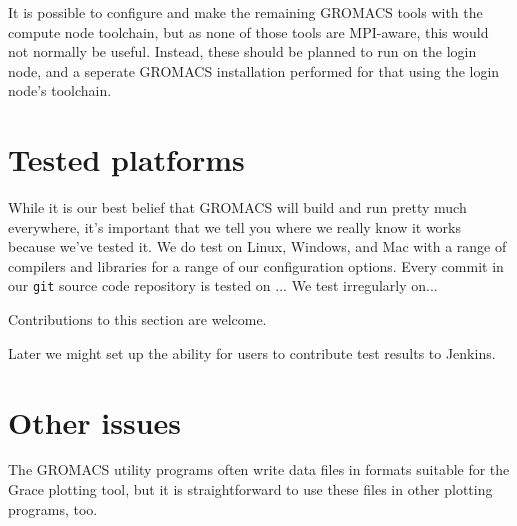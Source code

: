 \documentclass{article}[12pt,a4paper,twoside]
\newcommand{\gromacs}{GROMACS}
\newcommand{\mpi}{MPI}
\newcommand{\grace}{Grace}
\begin{document}
It is possible to configure and make the remaining \gromacs{} tools
with the compute node toolchain, but as none of those tools are
\mpi{}-aware, this would not normally be useful. Instead, these should
be planned to run on the login node, and a seperate \gromacs{}
installation performed for that using the login node's toolchain.

\section{Tested platforms}

While it is our best belief that \gromacs{} will build and run pretty
much everywhere, it's important that we tell you where we really know
it works because we've tested it. We do test on Linux, Windows, and
Mac with a range of compilers and libraries for a range of our
configuration options. Every commit in our \texttt{git} source code
repository is tested on ... We test irregularly on...

Contributions to this section are welcome.

Later we might set up the ability for users to contribute test results
to Jenkins.

\section{Other issues}

The \gromacs{} utility programs often write data files in formats
suitable for the \grace{} plotting tool, but it is straightforward to
use these files in other plotting programs, too.
\end{document}
